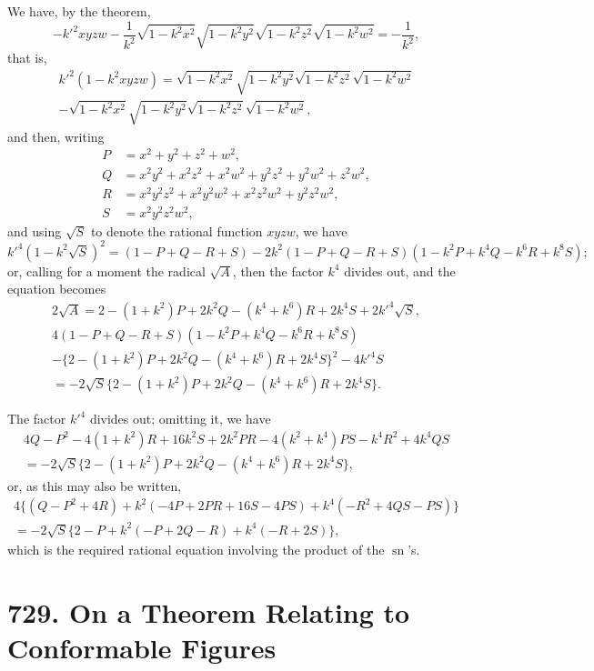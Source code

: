 \documentclass[12pt,a4paper]{article}
\theoremstyle{plain}
\DeclareMathOperator{\sn}{sn}
\begin{document}
We have, by the theorem,
\[
-k'^2 xyzw - \frac{1}{k^2}\sqrt{1-k^2x^2}\sqrt{1-k^2y^2}\sqrt{1-k^2z^2}\sqrt{1-k^2w^2}
= -\frac{1}{k^2},
\]
that is,
\begin{multline*}
k'^2(1-k^2xyzw) = \sqrt{1-k^2x^2}\sqrt{1-k^2y^2}\sqrt{1-k^2z^2}\sqrt{1-k^2w^2} \\
- \sqrt{1-k^2x^2}\sqrt{1-k^2y^2}\sqrt{1-k^2z^2}\sqrt{1-k^2w^2},
\end{multline*}
and then, writing
\begin{align*}
P &= x^2+y^2+z^2+w^2,\\
Q &= x^2y^2+x^2z^2+x^2w^2+y^2z^2+y^2w^2+z^2w^2,\\
R &= x^2y^2z^2+x^2y^2w^2+x^2z^2w^2+y^2z^2w^2,\\
S &= x^2y^2z^2w^2,
\end{align*}
and using $\sqrt{S}$ to denote the rational function $xyzw$, we have
\[
k'^4(1-k^2\sqrt{S})^2 = (1-P+Q-R+S)
-2k^2(1-P+Q-R+S)(1-k^2P+k^4Q-k^6R+k^8S);
\]
or, calling for a moment the radical $\sqrt{A}$, then the factor $k^4$ divides out, and
the equation becomes
\begin{multline*}
2\sqrt{A} = 2-(1+k^2)P+2k^2Q-(k^4+k^6)R+2k^4S+2k'^4\sqrt{S},\\
4(1-P+Q-R+S)(1-k^2P+k^4Q-k^6R+k^8S) \\
- \{2-(1+k^2)P+2k^2Q-(k^4+k^6)R+2k^4S\}^2 - 4k'^4S\\
= -2\sqrt{S}\{2-(1+k^2)P+2k^2Q-(k^4+k^6)R+2k^4S\}.
\end{multline*}

The factor $k'^4$ divides out; omitting it, we have
\begin{multline*}
4Q-P^2-4(1+k^2)R+16k^2S+2k^2PR-4(k^2+k^4)PS-k^4R^2+4k^4QS\\
= -2\sqrt{S}\{2-(1+k^2)P+2k^2Q-(k^4+k^6)R+2k^4S\},
\end{multline*}
or, as this may also be written,
\begin{multline*}
4\{(Q-P^2+4R)+k^2(-4P+2PR+16S-4PS)+k^4(-R^2+4QS-PS)\}\\
= -2\sqrt{S}\{2-P+k^2(-P+2Q-R)+k^4(-R+2S)\},
\end{multline*}
which is the required rational equation involving the product of the $\sn$'s.

\newpage
\section*{729. On a Theorem Relating to Conformable Figures}
\end{document}
